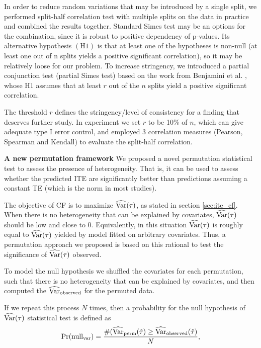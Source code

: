     In order to reduce random variations that may be introduced by a single split, we performed split-half correlation test with multiple splits on the data in practice and combined the results together. Standard Simes test \cite{simes1986improved} may be an options for the combination, since it is robust to positive dependency of p-values. Its alternative hypothesis $(\mathrm{H1})$ is that at least one of the hypotheses is non-null (at least one out of n splits yields a positive significant correlation), so it may be relatively loose for our problem. To increase stringency, we introduced a partial conjunction test (partial Simes test) based on the work from Benjamini et al. \cite{benjamini2008screening}, whose $\mathrm{H1}$ assumes that at least $r$ out of the $n$ splits yield a positive significant correlation. 
    
    The threshold $r$ defines the stringency/level of consistency for a finding that deserves further study. In experiment we set $r$ to be 10\% of $n$, which can give adequate type I error control, and employed 3 correlation measures (Pearson, Spearman and Kendall) to evaluate the split-half correlation.
  
    \textbf{A new permutation framework} We proposed a novel permutation statistical test to assess the presence of heterogeneity. That is, it can be used to assess whether the predicted ITE are significantly better than predictions assuming a constant TE (which is the norm in most studies). 

    The objective of CF is to maximize $\operatorname{\widehat{Var}}(\tau)$, as stated in section \ref{sec:ite_cf}. When there is no heterogeneity that can be explained by covariates, $\operatorname{\widehat{Var}}(\tau)$ should be low and close to 0. Equivalently, in this situation $\operatorname{\widehat{Var}}(\tau)$ is roughly equal to $\operatorname{\widehat{Var}}(\tau)$ yielded by model fitted on arbitrary covariates. Thus, a permutation approach we proposed is based on this rational to test the significance of $\operatorname{\widehat{Var}}(\tau)$ observed. 
    
    To model the null hypothesis we shuffled the covariates for each permutation, such that there is no heterogeneity that can be explained by covariates, and then computed the $\operatorname{\widehat{Var}}_\mathrm{observed}$ for the permuted data. 
    
    If we repeat this process $N$ times, then a probability for the null hypothesis of $\operatorname{\widehat{Var}}(\tau)$ statistical test is defined as 
    \begin{equation}
      \Pr (\mathrm{null_{var}}) = \frac{\#(\operatorname{\widehat{Var}}_\mathrm{perm}(\hat{\tau})\geq \operatorname{\widehat{Var}}_\mathrm{observed}(\hat{\tau})}{N},
    \end{equation}
    
